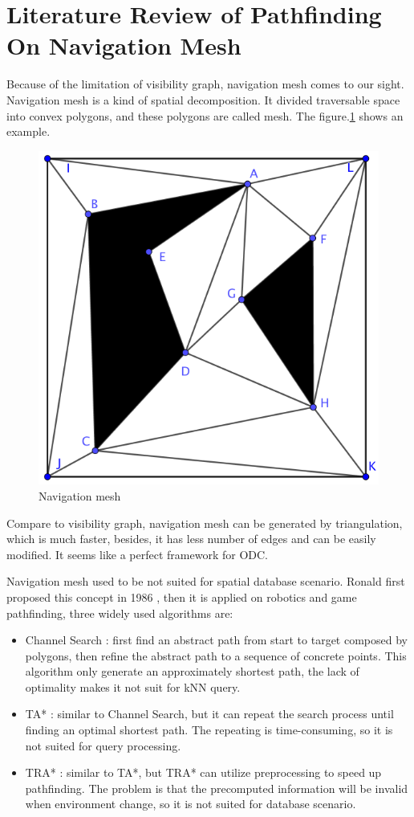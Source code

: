 \section{Literature Review of Pathfinding On Navigation Mesh}\label{meshpf}
Because of the limitation of visibility graph, navigation mesh comes to our sight. Navigation mesh
is a kind of spatial decomposition. It divided traversable space into convex polygons, and these
polygons are called mesh. The figure.\ref{nav} shows an example.
\begin{figure}[h]
  \centering
  \includegraphics[width=.5\linewidth]{pic/nav.png}
  \caption{Navigation mesh}
  \label{nav}
\end{figure}
Compare to visibility graph, navigation mesh can be generated by triangulation, which is much
faster, besides, it has less number of edges and can be easily modified. It seems like a
perfect framework for ODC.

Navigation mesh used to be not suited for spatial database scenario. Ronald first proposed this
concept in 1986 \cite{ronald1986pathfinding}, then it is applied on robotics and game
pathfinding, three widely used algorithms are:

\begin{itemize}
  \item Channel Search \cite{kallmann2005path}: first find an abstract path from start to target
    composed by polygons, then refine the abstract path to a sequence of concrete points. This
    algorithm only generate an approximately shortest path, the lack of optimality makes it not
    suit for kNN query.
  \item TA* \cite{demyen2006efficient}: similar to Channel Search, but it can repeat the search
    process until finding an optimal shortest path. The repeating is time-consuming, so it is not
    suited for query processing.
  \item TRA* \cite{demyen2006efficient}: similar to TA*, but TRA* can utilize preprocessing to
    speed up pathfinding. The problem is that the precomputed information will be invalid when
    environment change, so it is not suited for database scenario.
\end{itemize}

